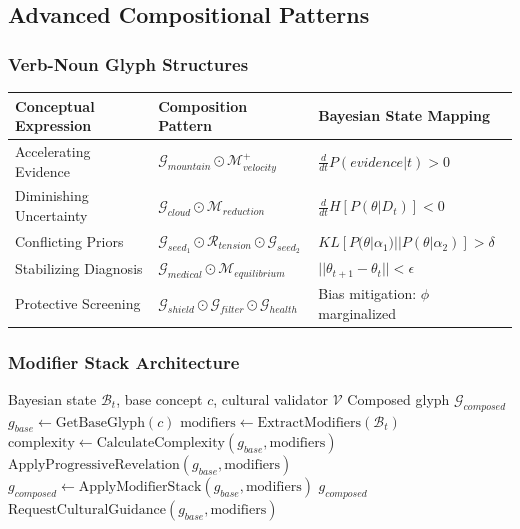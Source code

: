 \documentclass[12pt]{article}
\begin{document}
\subsection{Advanced Compositional Patterns}

\subsubsection{Verb-Noun Glyph Structures}

\begin{tabularx}{\textwidth}{|l|l|X|}
\hline
\textbf{Conceptual Expression} & \textbf{Composition Pattern} & \textbf{Bayesian State Mapping} \\
\hline
Accelerating Evidence & $\mathcal{G}_{mountain} \odot \mathcal{M}_{velocity}^+$ & $\frac{d}{dt}P(evidence | t) > 0$ \\
\hline
Diminishing Uncertainty & $\mathcal{G}_{cloud} \odot \mathcal{M}_{reduction}$ & $\frac{d}{dt}H[P(\theta | D_t)] < 0$ \\
\hline
Conflicting Priors & $\mathcal{G}_{seed_1} \odot \mathcal{R}_{tension} \odot \mathcal{G}_{seed_2}$ & $KL[P(\theta|\alpha_1) || P(\theta|\alpha_2)] > \delta$ \\
\hline
Stabilizing Diagnosis & $\mathcal{G}_{medical} \odot \mathcal{M}_{equilibrium}$ & $||\theta_{t+1} - \theta_t|| < \epsilon$ \\
\hline
Protective Screening & $\mathcal{G}_{shield} \odot \mathcal{G}_{filter} \odot \mathcal{G}_{health}$ & Bias mitigation: $\phi$ marginalized \\
\hline
\end{tabularx}

\subsubsection{Modifier Stack Architecture}

\begin{algorithm}
\caption{Compositional Glyph Generation}
\begin{algorithmic}[1]
\REQUIRE Bayesian state $\mathcal{B}_t$, base concept $c$, cultural validator $\mathcal{V}$
\ENSURE Composed glyph $\mathcal{G}_{composed}$
\STATE $g_{base} \leftarrow \text{GetBaseGlyph}(c)$
\STATE $\text{modifiers} \leftarrow \text{ExtractModifiers}(\mathcal{B}_t)$
\STATE $\text{complexity} \leftarrow \text{CalculateComplexity}(g_{base}, \text{modifiers})$
    \STATE \RETURN $\text{ApplyProgressiveRevelation}(g_{base}, \text{modifiers})$
\ENDIF
\STATE $g_{composed} \leftarrow \text{ApplyModifierStack}(g_{base}, \text{modifiers})$
    \STATE \RETURN $g_{composed}$
\ELSE
    \STATE \RETURN $\text{RequestCulturalGuidance}(g_{base}, \text{modifiers})$
\ENDIF
\end{algorithmic}
\end{algorithm}
\end{document}
